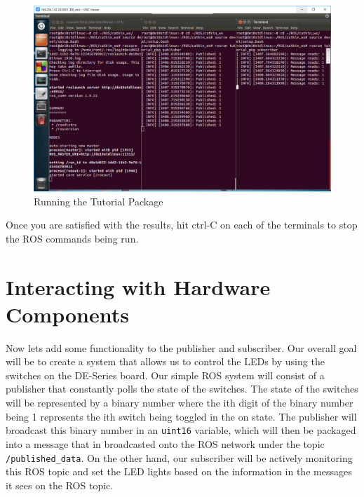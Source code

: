 \documentclass[11pt, twoside, pdftex]{article}
\begin{document}
\begin{figure}[H]
	\begin{center}
		\includegraphics[scale=0.55]{figures/rosrun_tutorial_pkg_1.png}
		\caption{Running the Tutorial Package}
		\label{fig:rosruntutorialpkg1}
	\end{center}
\end{figure}

Once you are satisfied with the results, hit ctrl-C on each of the terminals to stop the ROS commands being run.

\section{Interacting with Hardware Components}
Now lets add some functionality to the publisher and subscriber. Our overall goal will be to create a system that allows us to control the LEDs by using the switches on the DE-Series board. Our simple ROS system will consist of a publisher that constantly polls the state of the switches. The state of the switches will be represented by a binary number where the ith digit of the binary number being 1 represents the ith switch being toggled in the on state. The publisher will broadcast this binary number in an \lstinline|uint16| variable, which will then be packaged into a message that in broadcasted onto the ROS network under the topic \lstinline|/published_data|. On the other hand, our subscriber will be actively monitoring this ROS topic and set the LED lights based on the information in the messages it sees on the ROS topic. 

\newpage
\end{document}
